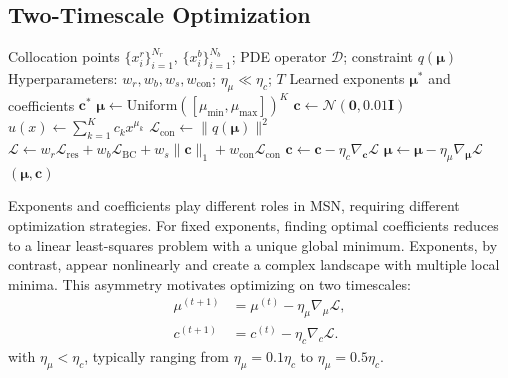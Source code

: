 \documentclass{article}
\theoremstyle{plain}
\theoremstyle{definition}
\theoremstyle{remark}
\newcommand{\mcN}{\mathcal{N}}
\newcommand{\mcL}{\mathcal{L}}
\newcommand{\mcD}{\mathcal{D}}
\newcommand{\bmu}{\bm{\mu}}
\newcommand{\bc}{\bm{c}}
\begin{document}
\subsection{Two-Timescale Optimization}
\label{sec:two_timescale}

\begin{algorithm}[t!]
	\caption{Constraint-Aware MSN-PINN Training}
	\label{alg:msn_pinn}
	\begin{algorithmic}[1]
		\Require Collocation points $\{x_i^r\}_{i=1}^{N_r}$, $\{x_i^b\}_{i=1}^{N_b}$; PDE operator $\mcD$; constraint $q(\bmu)$
		\Statex \hspace{-\algorithmicindent}Hyperparameters: $w_r, w_b, w_s, w_{\mathrm{con}}$; $\eta_\mu \ll \eta_c$; $T$
		\Ensure Learned exponents $\bmu^*$ and coefficients $\bc^*$
		\Statex
		\State $\bmu \gets \mathrm{Uniform}([\mu_{\min}, \mu_{\max}])^K$ 
		\State $\bc \gets \mcN(\mathbf{0}, 0.01\mathbf{I})$ 
		\Statex
		\State $\hat{u}(x) \gets \sum_{k=1}^K c_k x^{\mu_k}$ 
		\State $\mathcal{L}_{\mathrm{con}} \gets \|q(\bmu)\|^2$ 
		\State $\mathcal{L} \gets w_r \mathcal{L}_{\mathrm{res}} + w_b \mathcal{L}_{\mathrm{BC}} + w_s \|\bc\|_1 + w_{\mathrm{con}} \mathcal{L}_{\mathrm{con}}$
		\State $\bc \gets \bc - \eta_c \nabla_{\bc} \mathcal{L}$ 
		\State $\bmu \gets \bmu - \eta_\mu \nabla_{\bmu} \mathcal{L}$ 
		\EndFor
		\State \Return $(\bmu, \bc)$
	\end{algorithmic}
\end{algorithm}

Exponents and coefficients play different roles in MSN, requiring different optimization strategies. For fixed exponents, finding optimal coefficients reduces to a linear least-squares problem with a unique global minimum. Exponents, by contrast, appear nonlinearly and create a complex landscape with multiple local minima. This asymmetry motivates optimizing on two timescales:
\begin{equation}
	\begin{aligned}
		\mu^{(t+1)} & = \mu^{(t)} - \eta_\mu \nabla_\mu \mcL, \\
		c^{(t+1)}   & = c^{(t)} - \eta_c \nabla_c \mcL.
	\end{aligned}
\end{equation}
with $\eta_\mu < \eta_c$, typically ranging from $\eta_\mu = 0.1 \eta_c$ to $\eta_\mu = 0.5 \eta_c$.
\end{document}
